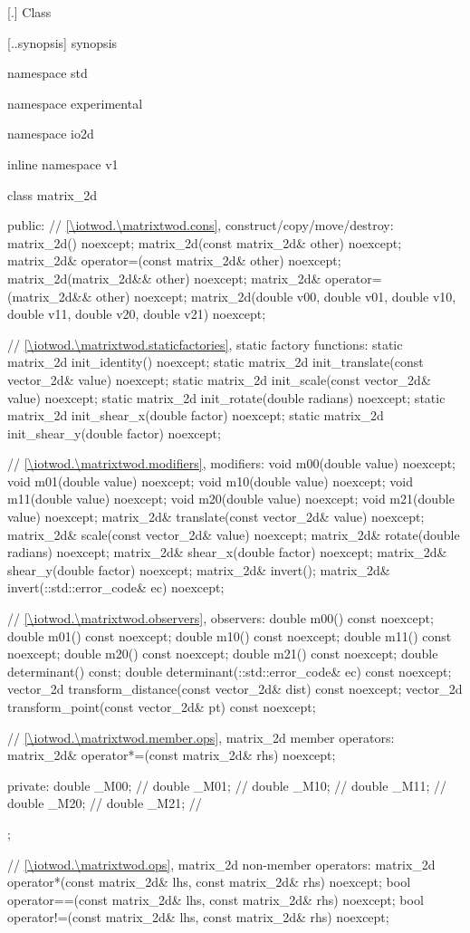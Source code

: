  [\iotwod.\matrixtwod] {Class }

 [\iotwod.\matrixtwod.synopsis] { synopsis}

\begin{codeblock}
namespace std { namespace experimental { namespace io2d { inline namespace v1 {
  class matrix_2d {
  public:
    // \ref{\iotwod.\matrixtwod.cons}, construct/copy/move/destroy:
    matrix_2d() noexcept;
    matrix_2d(const matrix_2d& other) noexcept;
    matrix_2d& operator=(const matrix_2d& other) noexcept;
    matrix_2d(matrix_2d&& other) noexcept;
    matrix_2d& operator=(matrix_2d&& other) noexcept;
    matrix_2d(double v00, double v01, double v10, double v11,
      double v20, double v21) noexcept;
    
    // \ref{\iotwod.\matrixtwod.staticfactories}, static factory functions:
    static matrix_2d init_identity() noexcept;
    static matrix_2d init_translate(const vector_2d& value) noexcept;
    static matrix_2d init_scale(const vector_2d& value) noexcept;
    static matrix_2d init_rotate(double radians) noexcept;
    static matrix_2d init_shear_x(double factor) noexcept;
    static matrix_2d init_shear_y(double factor) noexcept;
    
    // \ref{\iotwod.\matrixtwod.modifiers}, modifiers:
    void m00(double value) noexcept;
    void m01(double value) noexcept;
    void m10(double value) noexcept;
    void m11(double value) noexcept;
    void m20(double value) noexcept;
    void m21(double value) noexcept;
    matrix_2d& translate(const vector_2d& value) noexcept;
    matrix_2d& scale(const vector_2d& value) noexcept;
    matrix_2d& rotate(double radians) noexcept;
    matrix_2d& shear_x(double factor) noexcept;
    matrix_2d& shear_y(double factor) noexcept;
    matrix_2d& invert();
    matrix_2d& invert(::std::error_code& ec) noexcept;
    
    // \ref{\iotwod.\matrixtwod.observers}, observers:
    double m00() const noexcept;
    double m01() const noexcept;
    double m10() const noexcept;
    double m11() const noexcept;
    double m20() const noexcept;
    double m21() const noexcept;
    double determinant() const;
    double determinant(::std::error_code& ec) const noexcept;
    vector_2d transform_distance(const vector_2d& dist) const noexcept;
    vector_2d transform_point(const vector_2d& pt) const noexcept;
    
    // \ref{\iotwod.\matrixtwod.member.ops}, matrix_2d member operators:
    matrix_2d& operator*=(const matrix_2d& rhs) noexcept;
    
  private:
    double _M00; // \expos
    double _M01; // \expos
    double _M10; // \expos
    double _M11; // \expos
    double _M20; // \expos
    double _M21; // \expos
  };
    
  // \ref{\iotwod.\matrixtwod.ops}, matrix_2d non-member operators:
  matrix_2d operator*(const matrix_2d& lhs, const matrix_2d& rhs) noexcept;
  bool operator==(const matrix_2d& lhs, const matrix_2d& rhs) noexcept;
  bool operator!=(const matrix_2d& lhs, const matrix_2d& rhs) noexcept;
} } } }
\end{codeblock}

